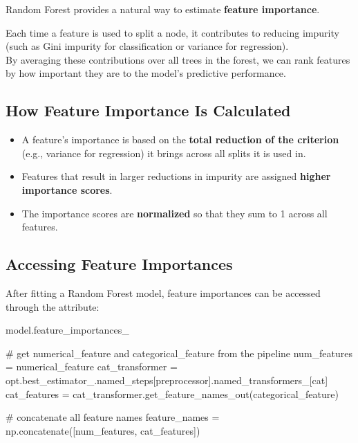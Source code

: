 \documentclass[
  letterpaper,
  DIV=11,
  numbers=noendperiod]{scrreprt}
\newenvironment{Shaded}{\begin{snugshade}}{\end{snugshade}}
\newcommand{\CommentTok}[1]{\textcolor[rgb]{0.37,0.37,0.37}{#1}}
\newcommand{\NormalTok}[1]{\textcolor[rgb]{0.00,0.23,0.31}{#1}}
\newcommand{\OperatorTok}[1]{\textcolor[rgb]{0.37,0.37,0.37}{#1}}
\newcommand{\StringTok}[1]{\textcolor[rgb]{0.13,0.47,0.30}{#1}}
\providecommand{\tightlist}{%
  \setlength{\itemsep}{0pt}\setlength{\parskip}{0pt}}\usepackage{longtable,booktabs,array}
\begin{document}
Random Forest provides a natural way to estimate \textbf{feature
importance}.

Each time a feature is used to split a node, it contributes to reducing
impurity (such as Gini impurity for classification or variance for
regression).\\
By averaging these contributions over all trees in the forest, we can
rank features by how important they are to the model's predictive
performance.

\subsection{How Feature Importance Is
Calculated}\label{how-feature-importance-is-calculated}

\begin{itemize}
\tightlist
\item
  A feature's importance is based on the \textbf{total reduction of the
  criterion} (e.g., variance for regression) it brings across all splits
  it is used in.
\item
  Features that result in larger reductions in impurity are assigned
  \textbf{higher importance scores}.
\item
  The importance scores are \textbf{normalized} so that they sum to 1
  across all features.
\end{itemize}

\subsection{Accessing Feature
Importances}\label{accessing-feature-importances}

After fitting a Random Forest model, feature importances can be accessed
through the attribute:

\begin{Shaded}
\begin{Highlighting}[]
\NormalTok{model.feature\_importances\_}
\end{Highlighting}
\end{Shaded}

\begin{Shaded}
\begin{Highlighting}[]
\CommentTok{\# get numerical\_feature and categorical\_feature from the pipeline}
\NormalTok{num\_features }\OperatorTok{=}\NormalTok{ numerical\_feature}
\NormalTok{cat\_transformer }\OperatorTok{=}\NormalTok{ opt.best\_estimator\_.named\_steps[}\StringTok{\textquotesingle{}preprocessor\textquotesingle{}}\NormalTok{].named\_transformers\_[}\StringTok{\textquotesingle{}cat\textquotesingle{}}\NormalTok{]}
\NormalTok{cat\_features }\OperatorTok{=}\NormalTok{ cat\_transformer.get\_feature\_names\_out(categorical\_feature)}

\CommentTok{\# concatenate all feature names}
\NormalTok{feature\_names }\OperatorTok{=}\NormalTok{ np.concatenate([num\_features, cat\_features])}
\end{Highlighting}
\end{Shaded}
\end{document}

